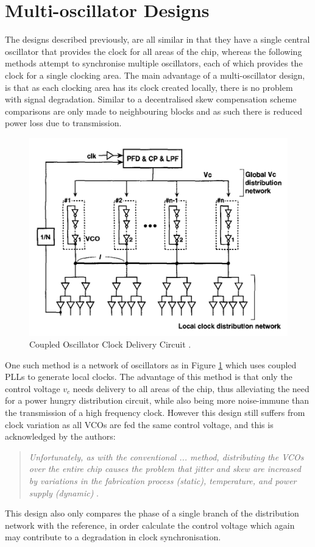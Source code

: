 \documentclass[11pt,english,british]{report}
\begin{document}
\section{Multi-oscillator Designs}
The designs described previously, are all similar in that they have a single central oscillator that provides the clock for all areas of the chip, whereas the following methods attempt to synchronise multiple oscillators, each of which provides the clock for a single clocking area. The main advantage of a multi-oscillator design, is that as each clocking area has its clock created locally, there is no problem with signal degradation. Similar to a decentralised skew compensation scheme comparisons are only made to neighbouring blocks and as such there is reduced power loss due to transmission.
\begin{figure}[h]
	\centering
	\includegraphics[scale=0.5]{../mizuno1998noise}
	\caption{Coupled Oscillator Clock Delivery Circuit \cite{mizuno1998noise}.}
	\label{fig:mizuno1998noise}
\end{figure}
One such method is a network of oscillators as in Figure \ref{fig:mizuno1998noise} which uses coupled PLLs to generate local clocks. The advantage of this method is that only the control voltage $v_c$ needs delivery to all areas of the chip, thus alleviating the need for a power hungry distribution circuit, while also being more noise-immune than the transmission of a high frequency clock. However this design still suffers from clock variation as all VCOs are fed the same control voltage, and this is acknowledged by the authors:
\begin{quotation}
	\singlespacing
	\textit{Unfortunately, as with the conventional ... method, distributing the VCOs over the entire chip causes the problem that jitter and skew are increased by variations in the fabrication process (static), temperature, and power supply (dynamic)} \cite{mizuno1998noise}.
	\doublespacing
\end{quotation}
This design also only compares the phase of a single branch of the distribution network with the reference, in order calculate the control voltage which again may contribute to a degradation in clock synchronisation. %
\end{document}
